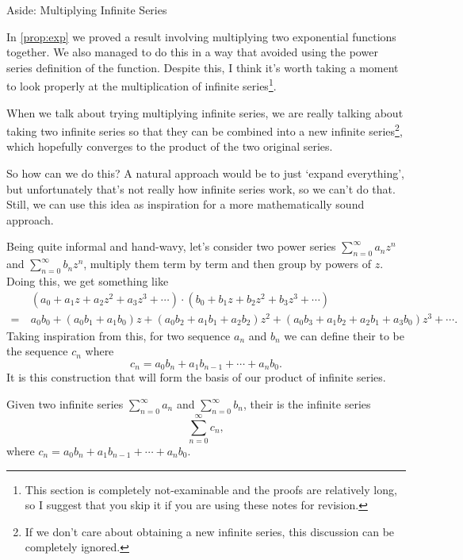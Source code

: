 \begin{aside}{Aside: Multiplying Infinite Series}

In \autoref{prop:exp} we proved a result involving multiplying two exponential functions together. We also managed to do this in a way that avoided using the power series definition of the function. Despite this, I think it's worth taking a moment to look properly at the multiplication of infinite series\footnote{This section is completely not-examinable and the proofs are relatively long, so I suggest that you skip it if you are using these notes for revision.}.

When we talk about trying multiplying infinite series, we are really talking about taking two infinite series so that they can be combined into a new infinite series\footnote{If we don't care about obtaining a new infinite series, this discussion can be completely ignored.}, which hopefully converges to the product of the two original series.

So how can we do this? A natural approach would be to just `expand everything', but unfortunately that's not really how infinite series work, so we can't do that. Still, we can use this idea as inspiration for a more mathematically sound approach. 

Being quite informal and hand-wavy, let's consider two power series $\sum_{n = 0}^{\infty} a_n z^n$ and $\sum_{n = 0}^{\infty} b_n z^n$, multiply them term by term and then group by powers of $z$. Doing this, we get something like 
\begin{align*}
	&(a_0 + a_1 z + a_2 z^2 + a_3 z^3 + \cdots) \cdot (b_0 + b_1 z + b_2 z^2 + b_3z^3 + \cdots)\\
	=\ & a_0 b_0 + (a_0 b_1 + a_1 b_0) z + (a_0 b_2 + a_1 b_1 + a_2 b_2) z^2 + (a_0 b_3 + a_1 b_2 + a_2 b_1 + a_3 b_0) z^3 + \cdots.
\end{align*}
Taking inspiration from this, for two sequence $a_n$ and $b_n$ we can define their  to be the sequence $c_n$ where
$$
	c_n = a_0 b_n + a_1 b_{n - 1} + \cdots + a_n b_0.
$$
It is this construction that will form the basis of our product of infinite series.

\begin{definition*}
	Given two infinite series $\sum_{n = 0}^{\infty} a_n$ and $\sum_{n = 0}^{\infty} b_n$, their  is the infinite series
	$$
	\sum_{n = 0}^{\infty} c_n,
	$$
	where $c_n = a_0 b_n + a_1 b_{n - 1} + \cdots + a_n b_0$.
\end{definition*}


\end{aside}
